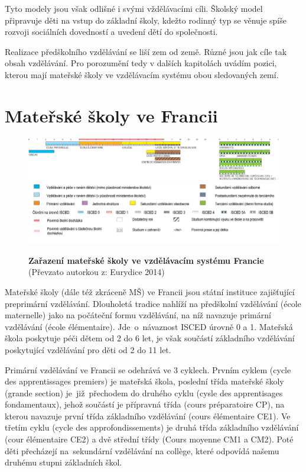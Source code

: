 		Tyto modely jsou však odlišné i svými vždělávacími cíli. Školský model připravuje děti na vstup do základní školy, kdežto rodinný typ se věnuje spíše rozvoji sociálních dovedností a uvedení dětí do společnosti.

		Realizace předškolního vzdělávání se liší zem od země. Různé jsou jak cíle tak obsah vzdělávání. Pro porozumění tedy v dalších kapitolách uvádím pozici, kterou mají mateřské školy ve vzdělávacím systému obou sledovaných zemí. 
		

	\section{Mateřské školy ve Francii}
	\label{msvefr}


		\begin{figure} [h!]
			\includegraphics[width=1.0\linewidth]{fotky/msFR.png} \\
			\includegraphics[width=1.0\linewidth]{fotky/msVysvetlivky.png}
			\caption{ \textbf{Zařazení mateřské školy ve vzdělávacím systému Francie}
			(Převzato autorkou z: Eurydice 2014)
			}
			\label{obr:msFR}
		\end{figure}

		Mateřské školy (dále též zkráceně MŠ) ve Francii jsou státní instituce zajišťující preprimární vzdělávání. Dlouholetá tradice nahlíží na předškolní vzdělávání (école maternelle) jako na počáteční formu vzdělávání, na níž navazuje primární vzdělávání (école élémentaire). Jde o návaznost ISCED  úrovně 0 a 1. Mateřská škola poskytuje péči dětem od 2 do 6 let, je však součástí základního vzdělávání poskytující vzdělávání pro děti od 2 do 11 let.

		Primární vzdělávání ve Francii se odehrává ve 3 cyklech. Prvním cyklem (cycle des apprentissages premiers) je mateřská škola, poslední třída mateřské školy (grande section) je již přechodem do druhého cyklu (cysle des apprentisages fondamentaux), jehož součástí je přípravná třída (cours préparatoire CP), na kterou navazuje první třída základního vzdělávání (cours élémentaire CE1). Ve třetím cyklu (cycle des approfondissements) je druhá třída základního vzdělávání (cour élémentaire CE2) a dvě střední třídy (Cours moyenne CM1 a CM2). Poté děti přecházejí na sekundární vzdělávání na collège, které odpovídá našemu druhému stupni základních škol. 

